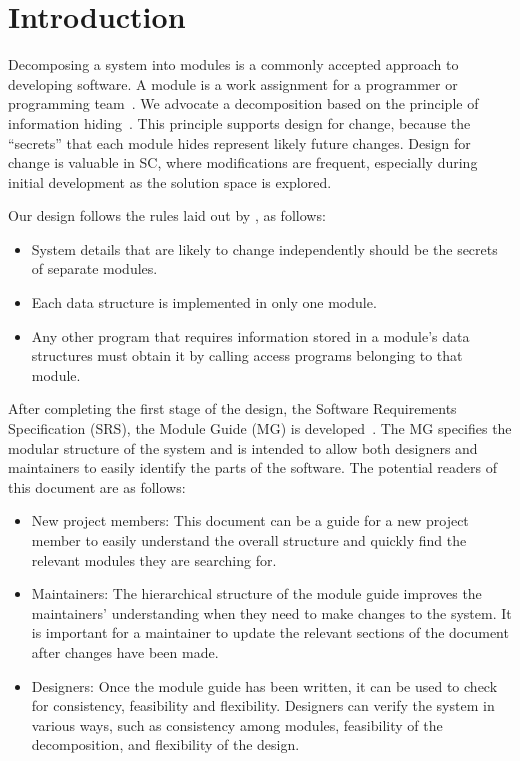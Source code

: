 \documentclass[12pt, titlepage]{article}
\begin{document}
\newpage

\tableofcontents

\listoftables

\listoffigures

\newpage


\section{Introduction}

Decomposing a system into modules is a commonly accepted approach to developing
software.  A module is a work assignment for a programmer or programming
team~\citep{ParnasEtAl1984}.  We advocate a decomposition
based on the principle of information hiding~\citep{Parnas1972a}.  This
principle supports design for change, because the ``secrets'' that each module
hides represent likely future changes.  Design for change is valuable in SC,
where modifications are frequent, especially during initial development as the
solution space is explored.  

Our design follows the rules laid out by \citet{ParnasEtAl1984}, as follows:
\begin{itemize}
\item System details that are likely to change independently should be the
  secrets of separate modules.
\item Each data structure is implemented in only one module.
\item Any other program that requires information stored in a module's data
  structures must obtain it by calling access programs belonging to that module.
\end{itemize}

After completing the first stage of the design, the Software Requirements
Specification (SRS), the Module Guide (MG) is developed~\citep{ParnasEtAl1984}. The MG
specifies the modular structure of the system and is intended to allow both
designers and maintainers to easily identify the parts of the software.  The
potential readers of this document are as follows:

\begin{itemize}
\item New project members: This document can be a guide for a new project member
  to easily understand the overall structure and quickly find the
  relevant modules they are searching for.
\item Maintainers: The hierarchical structure of the module guide improves the
  maintainers' understanding when they need to make changes to the system. It is
  important for a maintainer to update the relevant sections of the document
  after changes have been made.
\item Designers: Once the module guide has been written, it can be used to
  check for consistency, feasibility and flexibility. Designers can verify the
  system in various ways, such as consistency among modules, feasibility of the
  decomposition, and flexibility of the design.
\end{itemize}
\end{document}
